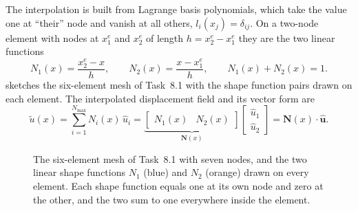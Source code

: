 \documentclass[11pt,a4paper]{article}
\numberwithin{equation}{section}
\theoremstyle{remark}
\newcommand{\bN}{\bm{N}}
\newcommand{\buh}{\hat{\bm{u}}}
\begin{document}
The interpolation is built from Lagrange basis polynomials, which take the value one at
``their'' node and vanish at all others, $l_i(x_j) = \delta_{ij}$. On a two-node element
with nodes at $x_1^e$ and $x_2^e$ of length $h = x_2^e - x_1^e$ they are the two linear
functions
\begin{equation}\label{eq:shapefun}
  N_1(x) = \frac{x_2^e - x}{h},
  \qquad
  N_2(x) = \frac{x - x_1^e}{h},
  \qquad
  N_1(x) + N_2(x) = 1 .
\end{equation}
 sketches the six-element mesh of Task~8.1 with the shape function pairs
drawn on each element. The interpolated displacement field and its vector form are
\begin{equation}\label{eq:interp}
  \tilde{u}(x) = \sum_{i=1}^{N_{\max}} N_i(x)\,\hat{u}_i
  = \underbrace{\begin{bmatrix} N_1(x) & N_2(x)\end{bmatrix}}_{\bN(x)}
    \begin{bmatrix} \hat{u}_1 \\ \hat{u}_2 \end{bmatrix}
  = \bN(x)\cdot\buh .
\end{equation}

\begin{figure}[ht]
  \centering
  \caption{The six-element mesh of Task~8.1 with seven nodes, and the two linear shape
    functions $N_1$ (blue) and $N_2$ (orange) drawn on every element. Each shape function
    equals one at its own node and zero at the other, and the two sum to one everywhere
    inside the element.}
  \label{fig:mesh}
\end{figure}
\end{document}
